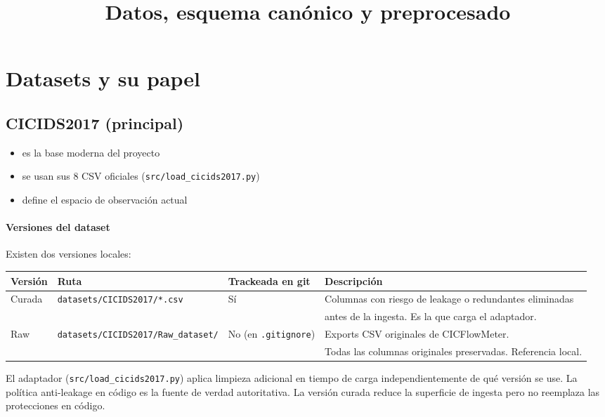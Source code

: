 ﻿\documentclass[12pt,a4paper]{article}
\title{Datos, esquema canónico y preprocesado}
\date{}
\begin{document}
\maketitle

\section{Datasets y su papel}

\subsection{CICIDS2017 (principal)}

\begin{itemize}
  \item es la base moderna del proyecto
  \item se usan sus 8 CSV oficiales (\verb|src/load_cicids2017.py|)
  \item define el espacio de observación actual
\end{itemize}

\paragraph{Versiones del dataset}

Existen dos versiones locales:

\begin{table}[htbp]
\footnotesize
\begin{tabular}{llll}
\hline
\textbf{Versión} & \textbf{Ruta} & \textbf{Trackeada en git} & \textbf{Descripción} \\
\hline
Curada
  & \verb|datasets/CICIDS2017/*.csv|
  & Sí
  & Columnas con riesgo de leakage o redundantes eliminadas \\
  & & & antes de la ingesta. Es la que carga el adaptador. \\
Raw
  & \verb|datasets/CICIDS2017/Raw_dataset/|
  & No (en \texttt{.gitignore})
  & Exports CSV originales de CICFlowMeter. \\
  & & & Todas las columnas originales preservadas. Referencia local. \\
\hline
\end{tabular}
\end{table}

El adaptador (\verb|src/load_cicids2017.py|) aplica limpieza adicional en tiempo de carga
independientemente de qué versión se use. La política anti-leakage en código es la fuente de verdad
autoritativa. La versión curada reduce la superficie de ingesta pero no reemplaza las protecciones
en código.
\end{document}

